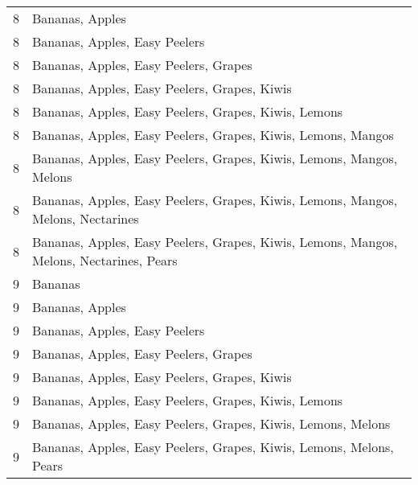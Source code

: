 \documentclass[11pt]{article}
\begin{document}
\begin{table}[h]
\begin{center}
\begin{tabular}{ll}
8 & Bananas, Apples \\
8 & Bananas, Apples, Easy Peelers \\
8 & Bananas, Apples, Easy Peelers, Grapes \\
8 & Bananas, Apples, Easy Peelers, Grapes, Kiwis \\
8 & Bananas, Apples, Easy Peelers, Grapes, Kiwis, Lemons \\
8 & Bananas, Apples, Easy Peelers, Grapes, Kiwis, Lemons, Mangos \\
8 & Bananas, Apples, Easy Peelers, Grapes, Kiwis, Lemons, Mangos, Melons \\
8 & Bananas, Apples, Easy Peelers, Grapes, Kiwis, Lemons, Mangos, Melons, Nectarines \\
8 & Bananas, Apples, Easy Peelers, Grapes, Kiwis, Lemons, Mangos, Melons, Nectarines, Pears \\
9 & Bananas \\
9 & Bananas, Apples \\
9 & Bananas, Apples, Easy Peelers \\
9 & Bananas, Apples, Easy Peelers, Grapes \\
9 & Bananas, Apples, Easy Peelers, Grapes, Kiwis \\
9 & Bananas, Apples, Easy Peelers, Grapes, Kiwis, Lemons \\
9 & Bananas, Apples, Easy Peelers, Grapes, Kiwis, Lemons, Melons \\
9 & Bananas, Apples, Easy Peelers, Grapes, Kiwis, Lemons, Melons, Pears \\
\hline \hline
\end{tabular}
\end{center}
\end{table}
\end{document}
